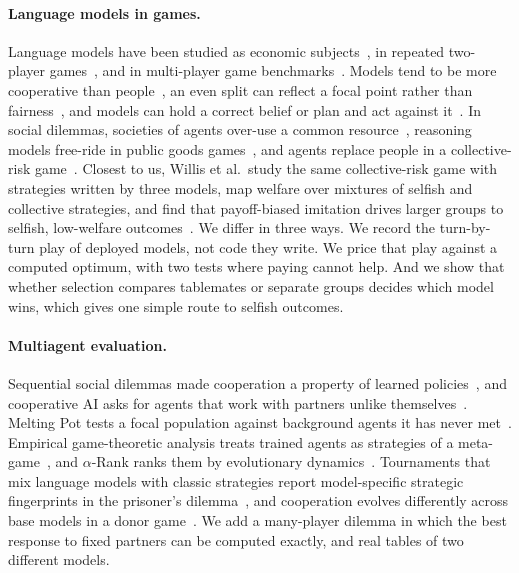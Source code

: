 \paragraph{Language models in games.}
Language models have been studied as economic
subjects~\cite{horton2023large,chen2023emergence,mei2024turing}, in repeated two-player
games~\cite{akata2025playing,fontana2024nicer}, and in multi-player game
benchmarks~\cite{huang2025competing}. Models tend to be more cooperative than
people~\cite{mei2024turing}, an even split can reflect a focal point rather than
fairness~\cite{dodivers2025uncovering}, and models can hold a correct belief or plan and act
against it~\cite{fan2024can,schmied2026llms}. In social dilemmas, societies of agents
over-use a common resource~\cite{piatti2024cooperate}, reasoning models free-ride in public
goods games~\cite{guzmanpiedrahita2025corrupted}, and agents replace people in a
collective-risk game~\cite{slumbers2025using}. Closest to us, Willis et al.\ study the same
collective-risk game with strategies written by three models, map welfare over mixtures of
selfish and collective strategies, and find that payoff-biased imitation drives larger
groups to selfish, low-welfare outcomes~\cite{willis2026evaluating}. We differ in three ways.
We record the turn-by-turn play of deployed models, not code they write. We price that play
against a computed optimum, with two tests where paying cannot help. And we show that
whether selection compares tablemates or separate groups decides which model wins, which
gives one simple route to selfish outcomes.

\paragraph{Multiagent evaluation.}
Sequential social dilemmas made cooperation a property of learned
policies~\cite{leibo2017multi,hughes2018inequity}, and cooperative AI asks for agents that
work with partners unlike themselves~\cite{dafoe2020open,stone2010ad}. Melting Pot tests a
focal population against background agents it has never met~\cite{leibo2021scalable}.
Empirical game-theoretic analysis treats trained agents as strategies of a
meta-game~\cite{wellman2006methods,tuyls2018generalised}, and $\alpha$-Rank ranks them by
evolutionary dynamics~\cite{omidshafiei2019alpha}. Tournaments that mix language models with
classic strategies report model-specific strategic fingerprints in the prisoner's
dilemma~\cite{payne2025strategic}, and cooperation evolves differently across base models in
a donor game~\cite{vallinder2025cultural}. We add a many-player dilemma in which the best
response to fixed partners can be computed exactly, and real tables of two different models.

